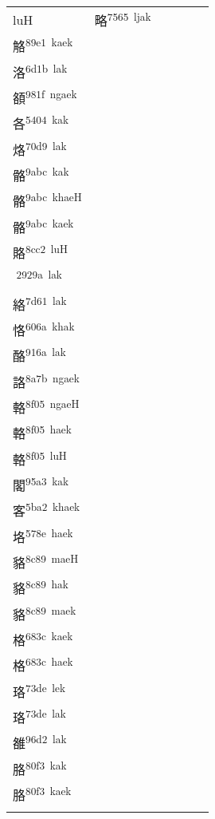 \documentclass[14pt,a4paper]{scrartcl}
\begin{document}
\begin{longtable}[c]{@{}llllll@{}}
\begin{minipage}[t]{0.14\columnwidth}\raggedright\strut
luH
\strut\end{minipage} &
\begin{minipage}[t]{0.14\columnwidth}\raggedright\strut
略\textsuperscript{7565~ljak}
\strut\end{minipage} &
\begin{minipage}[t]{0.14\columnwidth}\raggedright\strut
狢\textsuperscript{72e2~maek}\\
觡\textsuperscript{89e1~kaek}\\
洛\textsuperscript{6d1b~lak}\\
頟\textsuperscript{981f~ngaek}\\
各\textsuperscript{5404~kak}\\
烙\textsuperscript{70d9~lak}\\
骼\textsuperscript{9abc~kak}\\
骼\textsuperscript{9abc~khaeH}\\
骼\textsuperscript{9abc~kaek}\\
賂\textsuperscript{8cc2~luH}\\
𩊚\textsuperscript{2929a~lak}\\
絡\textsuperscript{7d61~lak}\\
恪\textsuperscript{606a~khak}\\
酪\textsuperscript{916a~lak}\\
詻\textsuperscript{8a7b~ngaek}\\
輅\textsuperscript{8f05~ngaeH}\\
輅\textsuperscript{8f05~haek}\\
輅\textsuperscript{8f05~luH}\\
閣\textsuperscript{95a3~kak}\\
客\textsuperscript{5ba2~khaek}\\
垎\textsuperscript{578e~haek}\\
貉\textsuperscript{8c89~maeH}\\
貉\textsuperscript{8c89~hak}\\
貉\textsuperscript{8c89~maek}\\
格\textsuperscript{683c~kaek}\\
格\textsuperscript{683c~haek}\\
珞\textsuperscript{73de~lek}\\
珞\textsuperscript{73de~lak}\\
雒\textsuperscript{96d2~lak}\\
胳\textsuperscript{80f3~kak}\\
胳\textsuperscript{80f3~kaek}\\

\end{minipage}
\end{longtable}
\end{document}
